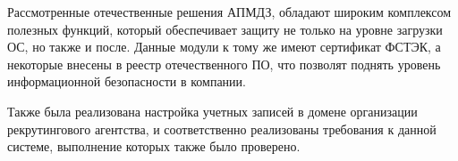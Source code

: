 Рассмотренные отечественные решения АПМДЗ, обладают широким комплексом 
полезных функций, который обеспечивает защиту не только на уровне загрузки ОС, 
но также и после. Данные модули к тому же имеют сертификат ФСТЭК, 
а некоторые внесены в реестр отечественного ПО, что позволят поднять уровень информационной 
безопасности в компании. 

Также была реализована настройка учетных записей в домене организации рекрутингового агентства,
и соответственно реализованы требования к данной системе, выполнение которых также было проверено.
